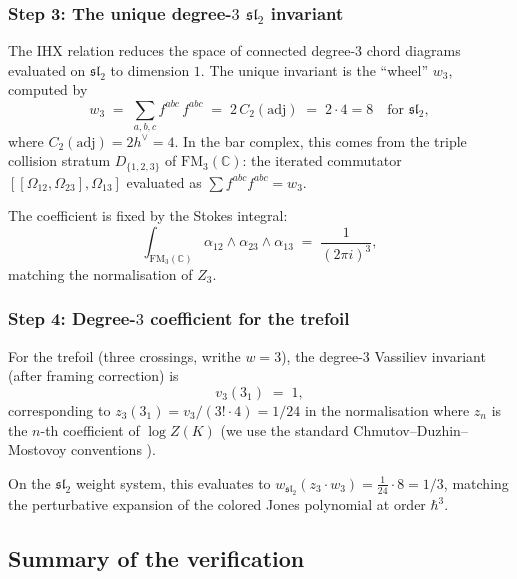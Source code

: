 \documentclass[11pt]{article}
\newcommand{\fsl}{\mathfrak{sl}}
\newcommand{\C}{\mathbb{C}}
\newcommand{\FM}{\mathrm{FM}}
\begin{document}
\subsubsection{Step 3: The unique degree-$3$ $\fsl_2$ invariant}

The IHX relation reduces the space of connected degree-$3$
chord diagrams evaluated on $\fsl_2$ to dimension $1$.
The unique invariant is the ``wheel'' $w_3$, computed by
\begin{equation}\label{eq:w3-computation}
  w_3
  \;=\;
  \sum_{a,b,c} f^{abc}\,f^{abc}
  \;=\;
  2\,C_2(\mathrm{adj})
  \;=\;
  2 \cdot 4 = 8
  \quad\text{for } \fsl_2,
\end{equation}
where $C_2(\mathrm{adj}) = 2h^\vee = 4$.  In the bar complex,
this comes from the triple collision stratum
$D_{\{1,2,3\}}$ of $\FM_3(\C)$: the iterated commutator
$[[\Omega_{12}, \Omega_{23}], \Omega_{13}]$ evaluated as
$\sum f^{abc}f^{abc} = w_3$.

The coefficient is fixed by the Stokes integral:
\[
  \int_{\FM_3(\C)} \alpha_{12} \wedge \alpha_{23}
  \wedge \alpha_{13}
  \;=\;
  \frac{1}{(2\pi i)^3},
\]
matching the normalisation of $Z_3$.

\subsubsection{Step 4: Degree-$3$ coefficient for the trefoil}

For the trefoil (three crossings, writhe $w = 3$), the
degree-$3$ Vassiliev invariant (after framing correction) is
\begin{equation}\label{eq:v3-trefoil}
  v_3(3_1) \;=\; 1,
\end{equation}
corresponding to $z_3(3_1) = v_3/(3!\cdot 4) = 1/24$ in the
normalisation where $z_n$ is the $n$-th coefficient of
$\log Z(K)$ (we use the standard Chmutov--Duzhin--Mostovoy
conventions \cite{CDM12}).

On the $\fsl_2$ weight system, this evaluates to
$w_{\fsl_2}(z_3 \cdot w_3) = \frac{1}{24} \cdot 8 = 1/3$,
matching the perturbative expansion of the colored Jones
polynomial at order $\hbar^3$.

\subsection{Summary of the verification}
\end{document}
